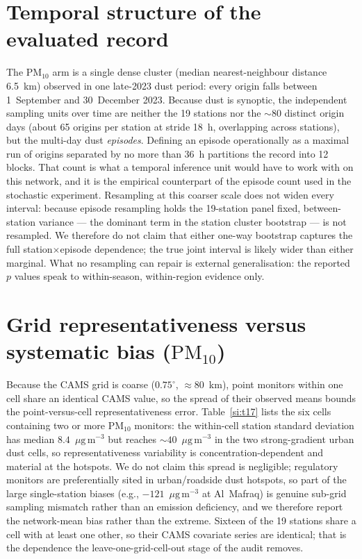 \documentclass[11pt]{article}
\newcommand*{\ugm}{\ensuremath{\mu\mathrm{g\,m^{-3}}}}
\newcommand*{\pmten}{\ensuremath{\mathrm{PM_{10}}}}
\begin{document}
\section{Temporal structure of the evaluated record}
The \pmten{} arm is a single dense cluster (median nearest-neighbour distance 6.5~km) observed in
one late-2023 dust period: every origin falls between 1~September and 30~December 2023. Because
dust is synoptic, the independent sampling units over time are neither the 19 stations nor the
$\sim$80 distinct origin days (about 65 origins per station at stride 18~h, overlapping across
stations), but the multi-day dust \emph{episodes}. Defining an episode operationally as a maximal
run of origins separated by no more than 36~h partitions the record into 12 blocks. That count is
what a temporal inference unit would have to work with on this network, and it is the empirical
counterpart of the episode count used in the stochastic experiment. Resampling at this coarser
scale does not widen every interval: because episode resampling holds the 19-station panel fixed,
between-station variance --- the dominant term in the station cluster bootstrap --- is not
resampled. We therefore do not claim that either one-way bootstrap captures the full
station$\times$episode dependence; the true joint interval is likely wider than either marginal.
What no resampling can repair is external generalisation: the reported $p$ values speak to
within-season, within-region evidence only.

\section{Grid representativeness versus systematic bias (\pmten{})}
Because the CAMS grid is coarse ($0.75^\circ$, $\approx$80~km), point monitors within one cell share an identical CAMS value, so the spread of their observed means bounds the point-versus-cell representativeness error. Table~\ref{si:t17} lists the six cells containing two or more \pmten{} monitors: the within-cell station standard deviation has median $8.4$~\ugm{} but reaches $\sim40$~\ugm{} in the two strong-gradient urban dust cells, so representativeness variability is concentration-dependent and material at the hotspots. We do not claim this spread is negligible; regulatory monitors are preferentially sited in urban/roadside dust hotspots, so part of the large single-station biases (e.g., $-121$~\ugm{} at Al~Mafraq) is genuine sub-grid sampling mismatch rather than an emission deficiency, and we therefore report the network-mean bias rather than the extreme. Sixteen of the 19 stations share a cell with at least one other, so their CAMS covariate series are identical; that is the dependence the leave-one-grid-cell-out stage of the audit removes.
\end{document}

